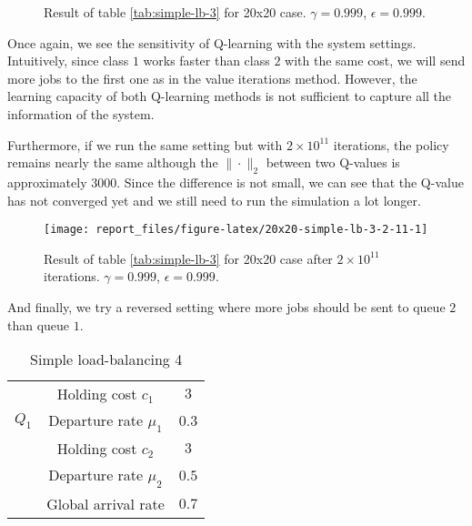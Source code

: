 \documentclass[
  a4paper, xcolor = usenames,dvipsnames]{article}
\theoremstyle{definition}
\theoremstyle{definition}
\theoremstyle{definition}
\theoremstyle{definition}
\theoremstyle{remark}
\begin{document}
\begin{figure}

{\centering {}

}

\caption{Result of table \ref{tab:simple-lb-3} for 20x20 case. \(\gamma = 0.999\), \(\epsilon = 0.999\).}\label{fig:20x20-simple-lb-3}
\end{figure}

Once again, we see the sensitivity of Q-learning with the system settings. Intuitively, since class \(1\) works faster than class \(2\) with the same cost, we will send more jobs to the first one as in the value iterations method. However, the learning capacity of both Q-learning methods is not sufficient to capture all the information of the system.

Furthermore, if we run the same setting but with \(2 \times 10^{11}\) iterations, the policy remains nearly the same although the \(\|\cdot\|_{2}\) between two Q-values is approximately \(3000\). Since the difference is not small, we can see that the Q-value has not converged yet and we still need to run the simulation a lot longer.



\begin{figure}

{\centering \texttt{[image: report\_files/figure-latex/20x20-simple-lb-3-2-11-1]} 

}

\caption{Result of table \ref{tab:simple-lb-3} for 20x20 case after \(2 \times 10^{11}\) iterations. \(\gamma = 0.999\), \(\epsilon = 0.999\).}\label{fig:20x20-simple-lb-3-2-11}
\end{figure}

And finally, we try a reversed setting where more jobs should be sent to queue \(2\) than queue \(1\).

\begin{table}[!htbp]
\caption{Simple load-balancing 4}
\begin{center}
\begin{tabular}{c c c}
    \hline
    \multirow{3}{*}{$Q_{1}$} & Holding cost $c_{1}$ & $3$ \\
    & Departure rate $\mu_{1}$ & $0.3$ \\
    \cline{2-3}
    \multirow{3}{*}{$Q_{2}$} & Holding cost $c_{2}$ & $3$ \\
    & Departure rate $\mu_{2}$ & $0.5$ \\
    \cline{2-3}
    & Global arrival rate & $0.7$ \\    
    \hline
\end{tabular}
\end{center}
\label{tab:simple-lb-4}
\end{table}
\end{document}
